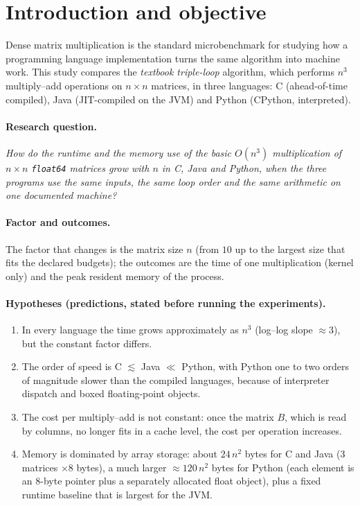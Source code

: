 \section{Introduction and objective}

Dense matrix multiplication is the standard microbenchmark for studying how a programming language
implementation turns the same algorithm into machine work. This study compares the \emph{textbook triple-loop}
algorithm, which performs $n^3$ multiply--add operations on $n\times n$ matrices, in three languages:
C (ahead-of-time compiled), Java (JIT-compiled on the JVM) and Python (CPython, interpreted).

\paragraph{Research question.} \emph{How do the runtime and the memory use of the basic $O(n^3)$ multiplication of
$n\times n$ \texttt{float64} matrices grow with $n$ in C, Java and Python, when the three programs use the same
inputs, the same loop order and the same arithmetic on one documented machine?}

\paragraph{Factor and outcomes.} The factor that changes is the matrix size $n$ (from $10$ up to the largest size
that fits the declared budgets); the outcomes are the time of one multiplication (kernel only) and the peak resident
memory of the process.

\paragraph{Hypotheses (predictions, stated before running the experiments).}
\begin{enumerate}
  \item[H1] In every language the time grows approximately as $n^3$ (log--log slope $\approx 3$), but the constant
        factor differs.
  \item[H2] The order of speed is C $\lesssim$ Java $\ll$ Python, with Python one to two orders of magnitude slower
        than the compiled languages, because of interpreter dispatch and boxed floating-point objects.
  \item[H3] The cost per multiply--add is not constant: once the matrix $B$, which is read by columns, no longer
        fits in a cache level, the cost per operation increases.
  \item[H4] Memory is dominated by array storage: about $24\,n^2$ bytes for C and Java ($3$ matrices $\times 8$ bytes), a
        much larger $\approx 120\,n^2$ bytes for Python (each element is an 8-byte pointer plus a separately allocated
        float object), plus a fixed runtime baseline that is largest for the JVM.
\end{enumerate}

